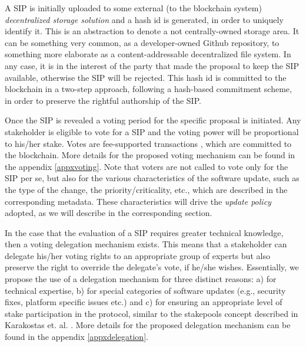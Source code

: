 A SIP is initially uploaded to some external (to the blockchain system) \emph{decentralized storage solution} and a hash id is generated, in order to uniquely identify it. This is an abstraction to denote a not centrally-owned storage area.%
  It can be something very common, as a developer-owned Github repository, to something more elaborate as a content-addressable decentralized file system. In any case, it is in the interest of the party that made the proposal to keep the SIP available, otherwise the SIP will be rejected.
 This hash id is committed to the blockchain in a two-step approach, following a hash-based commitment scheme, in order to preserve the rightful authorship of the SIP.

Once the SIP is revealed a voting period for the specific proposal is initiated. Any stakeholder is eligible to vote for a SIP and the voting power will be proportional to his/her stake. Votes are fee-supported transactions
, which are committed to the blockchain. More details for the proposed voting mechanism can be found in the appendix \ref{appxvoting}. Note that voters are not called to vote only for the SIP per se, but also for the various characteristics of the software update, such as the type of the change, the priority/criticality, etc., which are described in the corresponding metadata. These characteristics will drive the \emph{update policy} adopted, as we will describe in the corresponding section.

In the case that the evaluation of a SIP requires greater technical knowledge, then a voting delegation mechanism exists. This means that a stakeholder can delegate his/her voting rights to an appropriate group of experts but also preserve the right to override the delegate's vote, if he/she wishes. Essentially, we propose the use of a delegation mechanism for three distinct reasons: a) for technical expertise, b) for special categories of software updates (e.g., security fixes, platform specific issues etc.) and c) for ensuring an appropriate level of stake participation in the protocol, similar to the stakepools concept described in Karakostas et. al. \cite{stakepools}. More details for the proposed delegation mechanism can be found in the appendix \ref{appxdelegation}.

